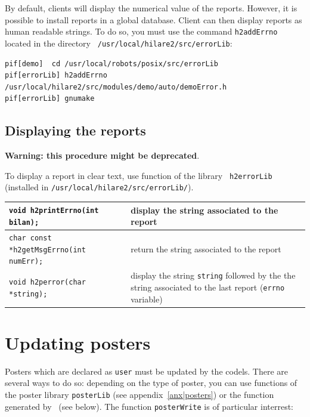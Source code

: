 By default, clients  will  display the  numerical value of  the  reports.
However, it is  possible to install  reports in a global database. Client
can then display  reports as human  readable strings. To  do so, you must
use  the command  {\tt    h2addErrno}  located in   the   directory  {\tt
/usr/local/hilare2/src/errorLib}:

\begin{center}\begin{cartouche}\small\begin{verbatim}
pif[demo]  cd /usr/local/robots/posix/src/errorLib
pif[errorLib] h2addErrno /usr/local/hilare2/src/modules/demo/auto/demoError.h
pif[errorLib] gnumake
\end{verbatim}\end{cartouche}\end{center}


\subsection{Displaying the reports}

{\bf Warning: this procedure might be deprecated}.

To  display a  report  in clear text,  use  function of  the library {\tt
h2errorLib} (installed in {\tt /usr/local/hilare2/src/errorLib/}).

\begin{center}\begin{tabularx}{\linewidth}{|lX|}
\hline
\tt void h2printErrno(int bilan); & display the string associated to the
report \\
\hline
\tt char const *h2getMsgErrno(int numErr); & return the string associated
to the report \\
\hline
\tt void h2perror(char *string);  & display the string {\tt string}
followed by the  the string associated to  the  last report ({\tt  errno}
variable)\\
\hline
\end{tabularx}\end{center}


\section{Updating posters}

Posters which are  declared as {\tt user}  must be updated by the codels.
There are several ways to do so: depending on the type of poster, you can
use  functions of    the      poster  library {\tt   posterLib}      (see
appendix~\ref{anx|posters}) or   the function  generated by \GenoM\  (see
below).  The function {\tt posterWrite} is of particular interrest:

